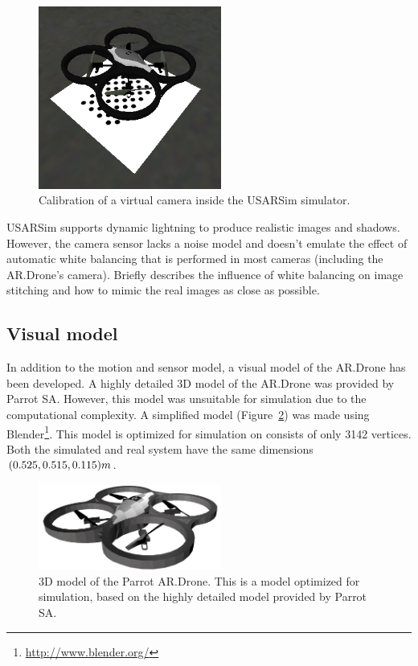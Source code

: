 \begin{figure}[htb!]
\centering
\includegraphics[width=6cm]{images/usarsim_camera_calibration.png}
\caption{Calibration of a virtual camera inside the USARSim simulator.} 
\label{fig:3Dmodel}
\end{figure}

USARSim supports dynamic lightning to produce realistic images and shadows.
However, the camera sensor lacks a noise model and doesn't emulate the effect of automatic white balancing that is performed in most cameras (including the AR.Drone's camera).
\cite{Visser2011imav} Briefly describes the influence of white balancing on image stitching and how to mimic the real images as close as possible.


		\subsection{Visual model}
In addition to the motion and sensor model, a visual model of the AR.Drone has been developed.
A highly detailed 3D model of the AR.Drone was provided by Parrot SA.
However, this model was unsuitable for simulation due to the computational complexity.
A simplified model (Figure~\ref{fig:3Dmodel}) was made using Blender\footnote{\url{http://www.blender.org/}}.
This model is optimized for simulation on consists of only 3142 vertices.
Both the simulated and real system have the same dimensions $(0.525,0.515,0.115)\small{m}$.

\begin{figure}[htb!]
\centering
\includegraphics[width=6cm]{images/ardrone_blender_final.png}
\caption{3D model of the Parrot AR.Drone. This is a model optimized for simulation, based on the highly detailed model provided by Parrot SA.} 
\label{fig:3Dmodel}
\end{figure}


